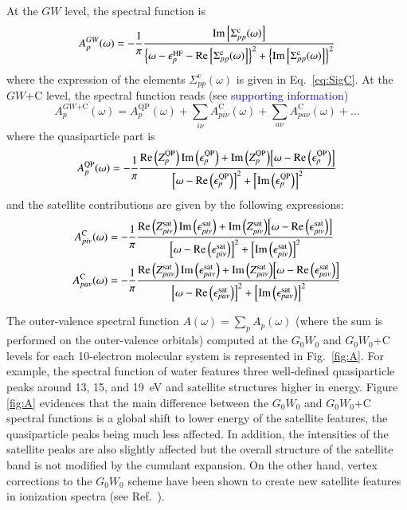 \documentclass[aip,jcp,reprint,noshowkeys,superscriptaddress]{revtex4-2}
\newcommand{\HF}{\text{HF}}
\newcommand{\GW}{\text{$GW$}}
\newcommand{\GWC}{\text{$GW$+C}}
\newcommand{\C}{\text{C}}
\newcommand{\co}{\text{c}}
\newcommand{\QP}{\text{QP}}
\newcommand{\sat}{\text{sat}}
\newcommand{\eps}{\epsilon}
\newcommand{\Sig}{\Sigma}
\newcommand{\SupMat}{\textcolor{blue}{supporting information}\xspace}
\begin{document}
At the $GW$ level, the spectral function is
\begin{equation}
	A_p^\GW(\omega) = - \frac{1}{\pi} \frac{\Im\qty[\Sig_{pp}^\co(\omega)]}{ \qty{ \omega - \eps_p^\HF - \Re\qty[\Sig_{pp}^\co(\omega)] }^2 + \qty{\Im\qty[\Sig_{pp}^\co(\omega)]}^2}
\end{equation}
where the expression of the elements $\Sig_{pp}^\co(\omega)$ is given in Eq.~\eqref{eq:SigC}. 
At the $GW$+C level, the spectral function reads (see \SupMat)
\begin{equation}
	A_p^\GWC(\omega) = A_p^\QP(\omega) + \sum_{i\nu} A_{pi\nu}^\C(\omega) + \sum_{a\nu} A_{pa\nu}^\C(\omega) + \ldots
\end{equation}
where the quasiparticle part is
\begin{equation}
	A_{p}^\QP(\omega) = - \frac{1}{\pi} \frac{\Re\qty(Z_p^\QP) \Im\qty(\eps_p^\QP) + \Im\qty(Z_p^\QP) \qty[ \omega - \Re\qty(\eps_p^\QP) ] }{ \qty[ \omega - \Re\qty(\eps_p^\QP) ]^2 + \qty[\Im\qty(\eps_p^\QP)]^2}
\end{equation}
and the satellite contributions are given by the following expressions:
\begin{subequations}
\begin{align}
	A_{pi\nu}^\C(\omega) & = - \frac{1}{\pi} \frac{\Re\qty(Z_{pi\nu}^\sat) \Im\qty(\eps_{pi\nu}^\sat) + \Im\qty(Z_{pi\nu}^\sat) \qty[ \omega - \Re\qty(\eps_{pi\nu}^\sat) ] }{ \qty[ \omega - \Re\qty(\eps_{pi\nu}^\sat) ]^2 + \qty[\Im\qty(\eps_{pi\nu}^\sat)]^2}
	\\
	A_{pa\nu}^\C(\omega) & = - \frac{1}{\pi} \frac{\Re\qty(Z_{pa\nu}^\sat) \Im\qty(\eps_{pa\nu}^\sat) + \Im\qty(Z_{pa\nu}^\sat) \qty[ \omega - \Re\qty(\eps_{pa\nu}^\sat) ] }{ \qty[ \omega - \Re\qty(\eps_{pa\nu}^\sat) ]^2 + \qty[\Im\qty(\eps_{pa\nu}^\sat)]^2}
\end{align}
\end{subequations}

The outer-valence spectral function $A(\omega) = \sum_{p} A_p(\omega)$ (where the sum is performed on the outer-valence orbitals) computed at the $G_0W_0$ and $G_0W_0$+C levels for each 10-electron molecular system is represented in Fig.~\ref{fig:A}.
For example, the spectral function of water features three well-defined quasiparticle peaks around 13, 15, and \SI{19}{\eV} and satellite structures higher in energy.
Figure \ref{fig:A} evidences that the main difference between the $G_0W_0$ and $G_0W_0$+C spectral functions is a global shift to lower energy of the satellite features, the quasiparticle peaks being much less affected. In addition, the intensities of the satellite peaks are also slightly affected but the overall structure of the satellite band is not modified by the cumulant expansion.
On the other hand, vertex corrections to the $G_0W_0$ scheme have been shown to create new satellite features in ionization spectra (see Ref.~).
\end{document}
